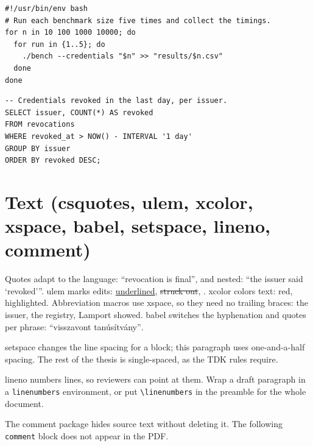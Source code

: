 \begin{listing}[!ht]
\begin{verbatim}
#!/usr/bin/env bash
# Run each benchmark size five times and collect the timings.
for n in 10 100 1000 10000; do
  for run in {1..5}; do
    ./bench --credentials "$n" >> "results/$n.csv"
  done
done
\end{verbatim}
\caption{Bash.}\label{guide:lst:latex:bash}
\end{listing}

\begin{listing}[!ht]
\begin{verbatim}
-- Credentials revoked in the last day, per issuer.
SELECT issuer, COUNT(*) AS revoked
FROM revocations
WHERE revoked_at > NOW() - INTERVAL '1 day'
GROUP BY issuer
ORDER BY revoked DESC;
\end{verbatim}
\caption{SQL.}\label{guide:lst:latex:sql}
\end{listing}
\FloatBarrier

\section{Text (csquotes, ulem, xcolor, xspace, babel, setspace, lineno, comment)}\label{guide:latex:text}
Quotes adapt to the language: \enquote{revocation is final}, and nested: \enquote{the issuer said \enquote{revoked}}.
ulem marks edits: \uline{underlined}, \sout{struck out}, . xcolor colors text: \textcolor{red!70!black}{red}, \colorbox{yellow!40}{highlighted}.
Abbreviation macros use xspace, so they need no trailing braces: \eg the issuer, \ie the registry, Lamport \etal showed.
babel switches the hyphenation and quotes per phrase: \foreignlanguage{magyar}{\enquote{visszavont tanúsítvány}}.

\begin{onehalfspace}
setspace changes the line spacing for a block; this paragraph uses one-and-a-half spacing.
The rest of the thesis is single-spaced, as the TDK rules require.
\end{onehalfspace}

\begin{linenumbers}
lineno numbers lines, so reviewers can point at them.
Wrap a draft paragraph in a \texttt{linenumbers} environment, or put \texttt{\textbackslash linenumbers} in the preamble for the whole document.
\end{linenumbers}

The comment package hides source text without deleting it. The following \texttt{comment} block does not appear in the PDF.

